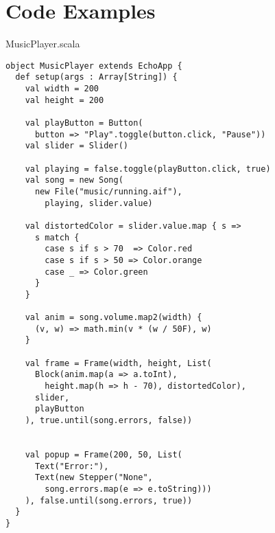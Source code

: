 \chapter{Code Examples}

MusicPlayer.scala

\begin{verbatim}
object MusicPlayer extends EchoApp {
  def setup(args : Array[String]) {
    val width = 200
    val height = 200

    val playButton = Button(
      button => "Play".toggle(button.click, "Pause"))
    val slider = Slider()

    val playing = false.toggle(playButton.click, true)
    val song = new Song(
      new File("music/running.aif"), 
        playing, slider.value)

    val distortedColor = slider.value.map { s =>
      s match {
        case s if s > 70  => Color.red
        case s if s > 50 => Color.orange
        case _ => Color.green 
      }
    }

    val anim = song.volume.map2(width) {
      (v, w) => math.min(v * (w / 50F), w)
    }

    val frame = Frame(width, height, List(
      Block(anim.map(a => a.toInt), 
        height.map(h => h - 70), distortedColor),
      slider,
      playButton
    ), true.until(song.errors, false))


    val popup = Frame(200, 50, List(
      Text("Error:"),
      Text(new Stepper("None", 
        song.errors.map(e => e.toString)))
    ), false.until(song.errors, true))
  }
}
\end{verbatim}